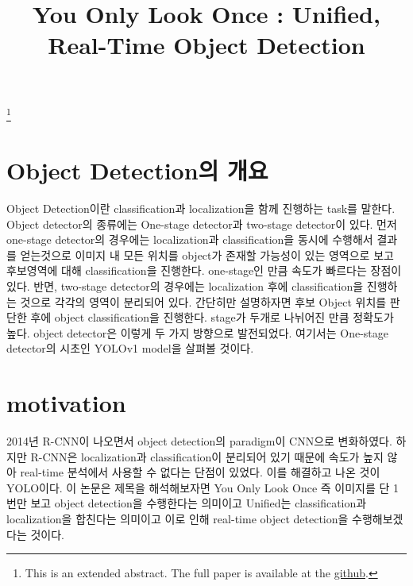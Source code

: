 \documentclass[extendedabs]{bmvc2k}
\begin{document}
\title{You Only Look Once : Unified, Real-Time Object Detection}
\maketitle
\let\thefootnote\relax\footnote{This is an extended abstract. The full paper is available at the \href{https://github.com/LeeGwanHui/TIL/tree/main/deeplearning_ham}{github}. }
\vspace{-0.2in}

\section{Object Detection의 개요}

\quad Object Detection이란 classification과 localization을 함께 진행하는 task를 말한다. Object detector의 종류에는 
One-stage detector과 two-stage detector이 있다. 먼저 one-stage detector의 경우에는 localization과 classification을 동시에 수행해서 결과를 얻는것으로
이미지 내 모든 위치를 object가 존재할 가능성이 있는 영역으로 보고 후보영역에 대해 classification을 진행한다. one-stage인 만큼 속도가 빠르다는 장점이 있다.
반면, two-stage detector의 경우에는 localization 후에 classification을 진행하는 것으로 각각의 영역이 분리되어 있다. 간단히만 설명하자면 후보 Object 위치를 판단한 후에
object classification을 진행한다. stage가 두개로 나뉘어진 만큼 정확도가 높다. object detector은 이렇게 두 가지 방향으로 발전되었다. 여기서는 
One-stage detector의 시초인 YOLOv1 model\cite{redmon2016you}을 살펴볼 것이다. 

\section{motivation}
 \quad 2014년 R-CNN이 나오면서 object detection의 paradigm이 CNN으로 변화하였다. 하지만 R-CNN은 localization과 classification이 분리되어 있기 때문에 
 속도가 높지 않아 real-time 분석에서 사용할 수 없다는 단점이 있었다. 이를 해결하고 나온 것이 YOLO이다. 이 논문은 제목을 해석해보자면
  You Only Look Once 즉 이미지를 단 1번만 보고 object detection을 수행한다는 의미이고 Unified는 classification과 localization을 합친다는 의미이고
 이로 인해 real-time object detection을 수행해보겠다는 것이다. 
\end{document}
